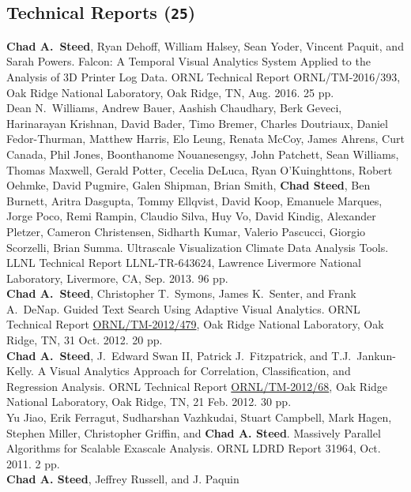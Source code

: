 \documentclass[11pt, letterpaper]{article}
\newcommand{\years}[1]{\marginnote{\scriptsize #1}}
\begin{document}
\subsection*{Technical Reports (\texttt{25})}
\begin{sloppypar}
\noindent\years{2016}\textbf{Chad A.\ Steed}, Ryan Dehoff, William Halsey, Sean Yoder,
Vincent Paquit, and Sarah Powers. Falcon: A Temporal Visual Analytics System Applied to the Analysis of 3D Printer Log Data.  ORNL Technical Report ORNL/TM-2016/393,
Oak Ridge National Laboratory, Oak Ridge, TN, Aug. 2016. 25 pp.\\
\years{2013}Dean N.\ Williams, Andrew Bauer, Aashish Chaudhary, Berk Geveci,
Harinarayan Krishnan, David Bader, Timo Bremer, Charles Doutriaux, Daniel Fedor-Thurman,
Matthew Harris, Elo Leung, Renata McCoy, James Ahrens, Curt Canada, Phil Jones,
Boonthanome Nouanesengsy, John Patchett, Sean Williams, Thomas Maxwell, Gerald Potter,
Cecelia DeLuca, Ryan O'Kuinghttons, Robert Oehmke, David Pugmire, Galen Shipman, Brian Smith,
\textbf{Chad Steed}, Ben Burnett, Aritra Dasgupta, Tommy Ellqvist, David Koop,
Emanuele Marques, Jorge Poco, Remi Rampin, Claudio Silva, Huy Vo, David Kindig, Alexander Pletzer,
Cameron Christensen, Sidharth Kumar, Valerio Pascucci, Giorgio Scorzelli, Brian Summa.
Ultrascale Visualization Climate Data Analysis Tools. LLNL Technical Report
LLNL-TR-643624, Lawrence Livermore National Laboratory, Livermore, CA, Sep. 2013. 96 pp.\\
\years{2012}\textbf{Chad A.\ Steed}, Christopher T.\ Symons,
James K.\ Senter, and Frank A.\ DeNap. Guided Text Search Using Adaptive
Visual Analytics. ORNL Technical Report
\href{http://info.ornl.gov/sites/publications/Files/Pub39480.pdf}{ORNL/TM-2012/479},
Oak Ridge National Laboratory, Oak Ridge, TN, 31 Oct. 2012. 20 pp.\\
\years{2012}\textbf{Chad A.\ Steed}, J.\ Edward Swan II,
Patrick J.\ Fitzpatrick, and T.J.\ Jankun-Kelly.  A Visual Analytics Approach
for Correlation, Classification, and Regression Analysis. ORNL Technical
Report \href{http://info.ornl.gov/sites/publications/Files/Pub24402.pdf}{ORNL/TM-2012/68},
Oak Ridge National Laboratory, Oak Ridge, TN,
21 Feb. 2012. 30 pp.\\
\years{2011}Yu Jiao, Erik Ferragut, Sudharshan Vazhkudai,
Stuart Campbell, Mark Hagen, Stephen Miller, Christopher Griffin, and
\textbf{Chad A. Steed}. Massively Parallel Algorithms for Scalable Exascale
Analysis. ORNL LDRD Report 31964, Oct. 2011. 2 pp.\\
\years{2010}\textbf{Chad A. Steed}, Jeffrey Russell, and J. Paquin

\end{sloppypar}
\end{document}
